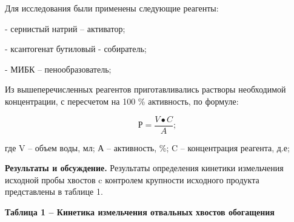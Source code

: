 Для исследования были применены следующие реагенты:

- сернистый натрий -- активатор;

- ксантогенат бутиловый - собиратель;

- МИБК -- пенообразователь;

Из вышеперечисленных реагентов приготавливались растворы необходимой
концентрации, с пересчетом на 100 \% активность, по формуле:

\[Р = \frac{V \bullet C}{A};\]

где V -- объем воды, мл; А -- активность, \%; C -- концентрация
реагента, д.е;

{\bfseries Результаты и обсуждение.} Результаты определения кинетики
измельчения исходной пробы хвостов c контролем крупности исходного
продукта представлены в таблице 1.

{\bfseries Таблица 1 -- Кинетика измельчения отвальных хвостов обогащения}

